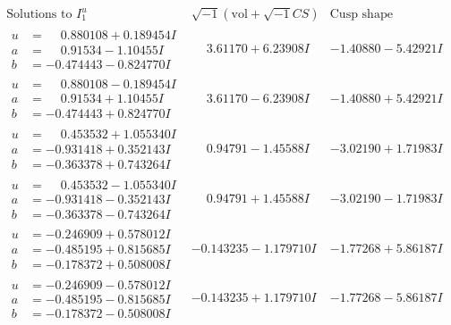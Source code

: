 \documentclass[1p]{elsarticle_modified}
\theoremstyle{definition}
\newcommand{\I}{\sqrt{-1}}
\begin{document}
$$\begin{array}{c|c|c}  
\text{Solutions to }I^u_{1}& \I (\text{vol} + \sqrt{-1}CS) & \text{Cusp shape}\\
 \hline 
\begin{aligned}
u &= \phantom{-}0.880108 + 0.189454 I \\
a &= \phantom{-}0.91534 - 1.10455 I \\
b &= -0.474443 - 0.824770 I\end{aligned}
 & \phantom{-}3.61170 + 6.23908 I & -1.40880 - 5.42921 I \\ \hline\begin{aligned}
u &= \phantom{-}0.880108 - 0.189454 I \\
a &= \phantom{-}0.91534 + 1.10455 I \\
b &= -0.474443 + 0.824770 I\end{aligned}
 & \phantom{-}3.61170 - 6.23908 I & -1.40880 + 5.42921 I \\ \hline\begin{aligned}
u &= \phantom{-}0.453532 + 1.055340 I \\
a &= -0.931418 + 0.352143 I \\
b &= -0.363378 + 0.743264 I\end{aligned}
 & \phantom{-}0.94791 - 1.45588 I & -3.02190 + 1.71983 I \\ \hline\begin{aligned}
u &= \phantom{-}0.453532 - 1.055340 I \\
a &= -0.931418 - 0.352143 I \\
b &= -0.363378 - 0.743264 I\end{aligned}
 & \phantom{-}0.94791 + 1.45588 I & -3.02190 - 1.71983 I \\ \hline\begin{aligned}
u &= -0.246909 + 0.578012 I \\
a &= -0.485195 + 0.815685 I \\
b &= -0.178372 + 0.508008 I\end{aligned}
 & -0.143235 - 1.179710 I & -1.77268 + 5.86187 I \\ \hline\begin{aligned}
u &= -0.246909 - 0.578012 I \\
a &= -0.485195 - 0.815685 I \\
b &= -0.178372 - 0.508008 I\end{aligned}
 & -0.143235 + 1.179710 I & -1.77268 - 5.86187 I \\ \hline\begin{aligned}

\end{aligned}
\end{array}$$
\end{document}
